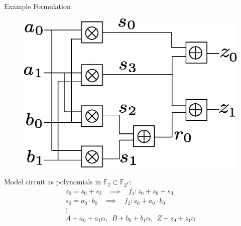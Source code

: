 \documentclass[xcolor=dvipsnames]{beamer}
\begin{document}
\begin{frame}{Example Formulation}

\begin{figure}[hbt]
\centerline{
\includegraphics[scale=0.4]{2bitmultiplier.eps}
}
\label{fig:mult-2-bit}
\end{figure}

Model circuit as polynomials in $\mathbb{F}_2 \subset \mathbb{F}_{2^k}$:
\begin{eqnarray}
z_0 = s_0 + s_3 ~~~~ \implies ~~~~ f_1: z_0 + s_0 + s_3 \nonumber\\
s_0 = a_0\cdot b_0 ~~~~ \implies ~~~~ f_2: s_0 + a_0\cdot b_0 \nonumber\\
\vdots\nonumber\\
A + a_0 + a_1\alpha, ~~B + b_0 + b_1\alpha, ~~Z + z_0 + z_1\alpha \nonumber
\end{eqnarray}
\end{frame}

\end{document}
